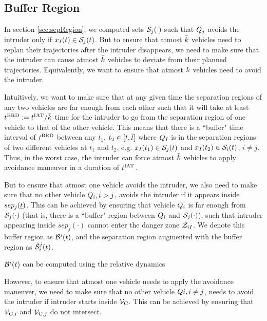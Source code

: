 \subsection{Buffer Region} \label{sec:buffRegion}
In section \ref{sec:sepRegion}, we computed sets $\mathcal{S}_j(\cdot)$ such that $Q_j$ avoids the intruder only if $x_{I}(t) \in \mathcal{S}_j(t)$. But to ensure that atmost $\bar{k}$ vehicles need to replan their trajectories after the intruder disappears, we need to make sure that the intruder can cause atmost $\bar{k}$ vehicles to deviate from their planned trajectories. Equivalently, we want to ensure that atmost $\bar{k}$ vehicles need to avoid the intruder. 

Intuitively, we want to make sure that at any given time the separation regions of any two vehicles are far enough from each other such that it will take at least $t^\text{BRD} := t^\text{IAT} / \bar{k}$ time for the intruder to go from the separation region of one vehicle to that of the other vehicle. This means that there is a ``buffer" time interval of $t^\text{BRD}$ between 
any $t_1$, $t_2 \in [\underline{t}, \bar{t}]$ where $Q_{I}$ is in the separation regions of two different vehicles at $t_1$ and $t_2$, e.g. $x_{I}(t_1) \in \mathcal{S}_j(t)$ and $x_{I}(t_2) \in \mathcal{S}_i(t)$, $i \neq j$. Thus, in the worst case, the intruder can force atmost $\bar{k}$ vehicles to apply avoidance maneuver in a duration of $t^\text{IAT}$.          



But to ensure that atmost one vehicle avoids the intruder, we also need to make sure that no other vehicle $Q_i, i>j$, avoids the intruder if it appears inside $sep_j(\underline{t})$. This can be achieved by ensuring that vehicle $Q_i$ is far enough from $\mathcal{S}_j(\cdot)$ (that is, there is a ``buffer" region between $Q_i$ and $\mathcal{S}_j(\cdot)$), such that intruder appearing inside $sep_j(\cdot)$ cannot enter the danger zone $\mathcal{Z}_{iI}$. We denote this buffer region as $\mathcal{B}^i(t)$, and the separation region augmented with the buffer region as $\tilde{\mathcal{S}}^j_i(t)$.

$\mathcal{B}^i(t)$ can be computed using the relative dynamics 

However, to ensure that atmost one vehicle needs to apply the avoidance maneuver, we need to make sure that no other vehicle $Q{i}, i \neq j$, needs to avoid the intruder if intruder starts inside $\mathcal{V}_\text{C}$. This can  be achieved by ensuring that $\mathcal{V}_{\text{C},i}$ and $\mathcal{V}_{\text{C},j}$ do not intersect.





